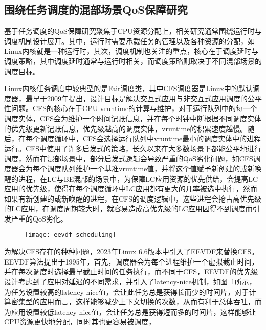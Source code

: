 \subsection{围绕任务调度的混部场景QoS保障研究}


基于任务调度的QoS保障研究聚焦于CPU资源分配上，相关研究通常围绕运行时与调度机制设计展开。其中，运行时需要承载任务的管理以及各种资源的分配，如Linux内核就是一种运行时，其次，调度机制也关注的重点，核心在于调度延时与调度策略，其中调度延时通常与运行时相关，而调度策略则取决于不同混部场景的调度目标。

Linux内核任务调度中较典型的是Fair调度类，其中CFS调度器\citep{pabla2009completely}是Linux中的默认调度器，最早于2009年提出，设计目标是解决交互式应用与非交互式应用调度的公平性问题。CFS的核心在于CPU vruntime的计算与维护，对于运行队列中的每一个调度实体，CFS会为维护一个时间记账信息，并在每个时钟中断根据不同调度实体的优先级更新记账信息，优先级越高的调度实体，vruntime的积累速度越慢。随后，在每个调度循环中，CFS会选择运行队列中vruntime最小的调度实体中的进程运行。CFS中使用了许多启发式的策略，长久以来在大多数场景下都能公平地进行调度，然而在混部场景中，部分启发式逻辑会导致严重的QoS劣化问题，如CFS调度器会为每个调度队列维护一个基准vruntime值，并将这个值赋予新创建的或新唤醒的进程，在LC与BE混部的场景中，为保障LC应用资源的优先供给，会提高LC应用的优先级，使得在每个调度循环中LC应用都有更大的几率被选中执行，然而如果有新创建的或新唤醒的进程，在CFS的调度逻辑中，这些进程会抢占高优先级的LC应用，在调度周期较大时，就容易造成高优先级的LC应用因得不到调度而引发严重的QoS劣化。

\begin{figure}[!htbp]
    \centering
    \texttt{[image: eevdf\_scheduling]}
    \label{fig:eevdf_scheduling}
\end{figure}

为解决CFS存在的种种问题，2023年Linux 6.6版本中引入了EEVDF来替换CFS。EEVDF算法\citep{stoica1995earliest}提出于1995年，首先，调度器会为每个进程维护一个虚拟截止时间，并在每次调度时选择最早截止时间的任务执行，而不同于CFS，EEVDF的优先级设计考虑到了应用对延迟的不同需求，并引入了latency-nice机制，如图~\ref{fig:eevdf_scheduling}所示，为任务设置较高的latency-nice值，会让此任务总是获得长而少的时间片，对于计算密集型的应用而言，这样能够减少上下文切换的次数，从而有利于总体吞吐，而为应用设置较低latency-nice值，会让任务总是获得短而多的时间片，这样能够让CPU资源更快地分配，同时其也更容易被调度，

